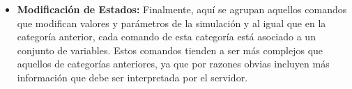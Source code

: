 \begin{itemize}
    \item \textbf{Modificación de Estados:} Finalmente, aquí se agrupan aquellos comandos que modifican valores y parámetros de la simulación y al igual que en la categoría anterior, cada comando de esta categoría está asociado a un conjunto de variables. Estos comandos tienden a ser más complejos que aquellos de categorías anteriores, ya que por razones obvias incluyen más información que debe ser interpretada por el servidor.    
\end{itemize}

